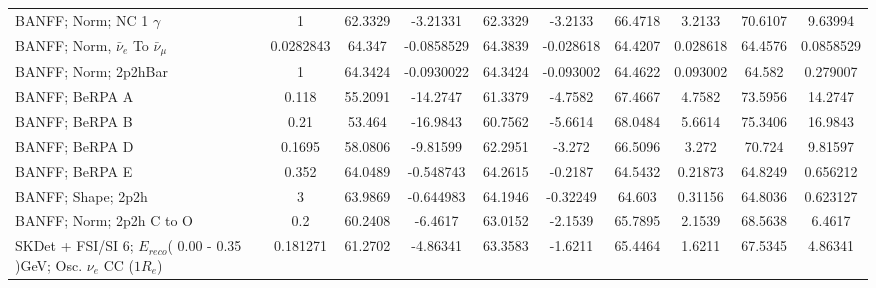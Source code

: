 \begin{tabular}{| l | S | S  S | S  S | S  S | S  S | }
                                                      BANFF; Norm; NC 1 $\gamma$ &               1 &         62.3329 &        -3.21331 &         62.3329 &         -3.2133 &         66.4718 &          3.2133 &         70.6107 &         9.63994 \\ 
                               BANFF; Norm, $\bar{\nu}_{e}$ To $\bar{\nu}_{\mu}$ &       0.0282843 &          64.347 &      -0.0858529 &         64.3839 &       -0.028618 &         64.4207 &        0.028618 &         64.4576 &       0.0858529 \\ 
                                                            BANFF; Norm; 2p2hBar &               1 &         64.3424 &      -0.0930022 &         64.3424 &       -0.093002 &         64.4622 &        0.093002 &          64.582 &        0.279007 \\ 
                                                                  BANFF; BeRPA A &           0.118 &         55.2091 &        -14.2747 &         61.3379 &         -4.7582 &         67.4667 &          4.7582 &         73.5956 &         14.2747 \\ 
                                                                  BANFF; BeRPA B &            0.21 &          53.464 &        -16.9843 &         60.7562 &         -5.6614 &         68.0484 &          5.6614 &         75.3406 &         16.9843 \\ 
                                                                  BANFF; BeRPA D &          0.1695 &         58.0806 &        -9.81599 &         62.2951 &          -3.272 &         66.5096 &           3.272 &          70.724 &         9.81597 \\ 
                                                                  BANFF; BeRPA E &           0.352 &         64.0489 &       -0.548743 &         64.2615 &         -0.2187 &         64.5432 &         0.21873 &         64.8249 &        0.656212 \\ 
                                                              BANFF; Shape; 2p2h &               3 &         63.9869 &       -0.644983 &         64.1946 &        -0.32249 &          64.603 &         0.31156 &         64.8036 &        0.623127 \\ 
                                                        BANFF; Norm; 2p2h C to O &             0.2 &         60.2408 &         -6.4617 &         63.0152 &         -2.1539 &         65.7895 &          2.1539 &         68.5638 &          6.4617 \\ 
   SKDet + FSI/SI  6; $E_{reco}$( 0.00 - 0.35 )GeV; Osc. $\nu_{e}$ CC ($1R_{e}$) &        0.181271 &         61.2702 &        -4.86341 &         63.3583 &         -1.6211 &         65.4464 &          1.6211 &         67.5345 &         4.86341 \\ 

\end{tabular}
